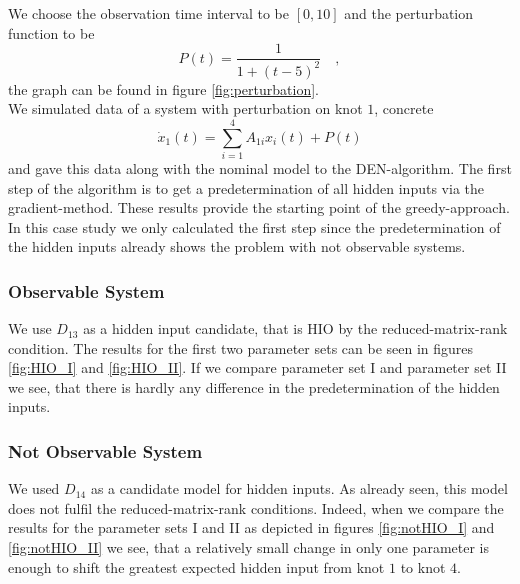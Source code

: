 

We choose the observation time interval to be $[0,10]$ and the perturbation function to be 
\begin{equation}
		P(t) = \frac{1}{1+(t-5)^2} \quad ,
\end{equation}	
the graph can be found in figure \ref{fig:perturbation}. \\



We simulated data of a system with perturbation on knot $1$, concrete
	\begin{equation}
	\dot{x}_1 (t) = \sum\limits_{i=1}^4 A_{1i} x_i(t) + P(t) 
	\end{equation}
and gave this data along with the nominal model to the DEN-algorithm. The first step of 
the algorithm is to get a predetermination of all hidden inputs via the gradient-method. 
These results provide the starting point of the greedy-approach. In this case study we only 
calculated the first step since the predetermination of the hidden inputs already shows 
the problem with not observable systems.
	
\clearpage
	\subsubsection*{Observable System}
	We use $D_{13}$ as a hidden input candidate, that is HIO by the reduced-matrix-rank 
	condition. The results for the first two parameter sets can be seen in figures
	\ref{fig:HIO_I} and \ref{fig:HIO_II}. 
	If we compare parameter set I and parameter set II we see, that there is hardly any 
	difference in the predetermination of the hidden inputs.
	
 		
	
	\subsubsection*{Not Observable System}
	We used $D_{14}$ as a candidate model for hidden inputs. As already seen, this model 
	does not fulfil the reduced-matrix-rank conditions. Indeed, when we compare the results 
	for the parameter sets I and II as depicted in figures \ref{fig:notHIO_I} and 
	\ref{fig:notHIO_II} we see, that a relatively small change in only 
	one parameter is enough to shift the greatest expected hidden input from knot $1$ to 
	knot $4$. 
	
 	